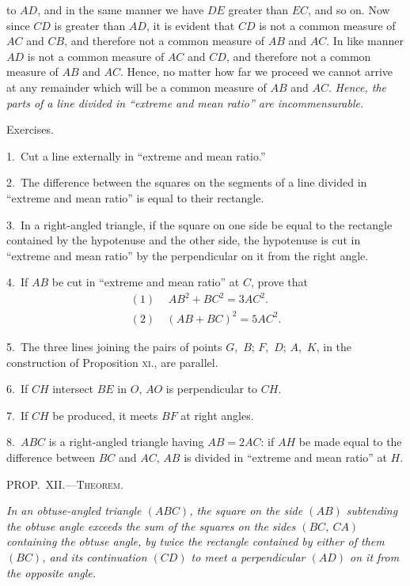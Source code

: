 \documentclass[oneside]{book}
\newcommand\mypropl[2]{
\bigskip\Needspace*{4\baselineskip}\begin{center}\textsc{#1}\end{center}
\hspace{\parindent}\emph{#2}\par\medskip
}
\newcommand\exhead[1]{
\Needspace*{5\baselineskip}\begin{center}
\textsf{#1}
\end{center}
}
\begin{document}
to $AD$, and in the same manner we have $DE$ greater
than $EC$, and so on. Now since $CD$ is greater than $AD$,
it is evident that $CD$ is not a common measure of $AC$
and $CB$, and therefore not a common measure of $AB$
and $AC$. In like manner $AD$ is not a common measure
of $AC$ and $CD$, and therefore not a common measure of
$AB$ and $AC$. Hence, no matter how far we proceed
we cannot arrive at any remainder which will be a
common measure of $AB$ and $AC$. \textit{Hence, the parts of a
line divided in ``extreme and mean ratio''
are incommensurable.}

\exhead{Exercises.}

\begin{footnotesize}
1.~Cut a line externally in ``extreme and mean ratio.''

2.~The difference between the squares on the segments of a
line divided in ``extreme and mean ratio'' is equal to their
rectangle.

3.~In a right-angled triangle, if the square on one side be equal
to the rectangle contained by the hypotenuse and the other side,
the hypotenuse is cut in ``extreme and mean ratio'' by the
perpendicular on it from the right angle.

4.~If $AB$ be cut in ``extreme and mean ratio'' at $C$, prove
that
\begin{align*}
  (1) &\,\ AB^2 + BC^2 = 3AC^2.  \\
  (2) &\  (AB + BC)^2 = 5AC^2.
\end{align*}

5.~The three lines joining the pairs of points $G$,~$B$; $F$,~$D$;
$A$,~$K$, in the construction of Proposition \textsc{xi}., are parallel.

6.~If $CH$ intersect $BE$ in $O$, $AO$ is perpendicular to $CH$.

7.~If $CH$ be produced, it meets $BF$ at right angles.

8.~$ABC$ is a right-angled triangle having $AB = 2AC$: if $AH$
be made equal to the difference between $BC$ and $AC$, $AB$ is
divided in ``extreme and mean ratio'' at $H$.
\par\end{footnotesize}


\mypropl{PROP\@.~XII\@.---Theorem.}{In an obtuse-angled triangle $(ABC)$, the square on the
side $(AB)$ subtending the obtuse angle exceeds the sum of
the squares on the sides $(BC,\ CA)$ containing the obtuse
angle, by twice the rectangle contained by either of them
$(BC)$, and its continuation $(CD)$ to meet a perpendicular
$(AD)$ on it from the opposite angle.}
\end{document}
